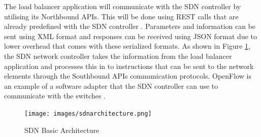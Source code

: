 \newline
\par
The load balancer application will communicate with the SDN controller by utilising its Northbound APIs. This will be done using REST calls that are already predefined with the SDN controller \cite{northbound}. Parameters and information can be sent using XML format and responses can be received using JSON format due to lower overhead that comes with these serialized formats. As shown in Figure \ref{fig:sdnarch}, the SDN network controller takes the information from the load balancer application and processes this in to instructions that can be sent to the network elements through the Southbound APIs communication protocols. OpenFlow is an example of a software adapter that the SDN controller can use to communicate with the switches \cite{southbound}.

\begin{figure}[h!]
 \centering
 \texttt{[image: images/sdnarchitecture.png]}
 \caption{SDN Basic Architecture \cite{sdnarch}}
 \label{fig:sdnarch}
\end{figure}

